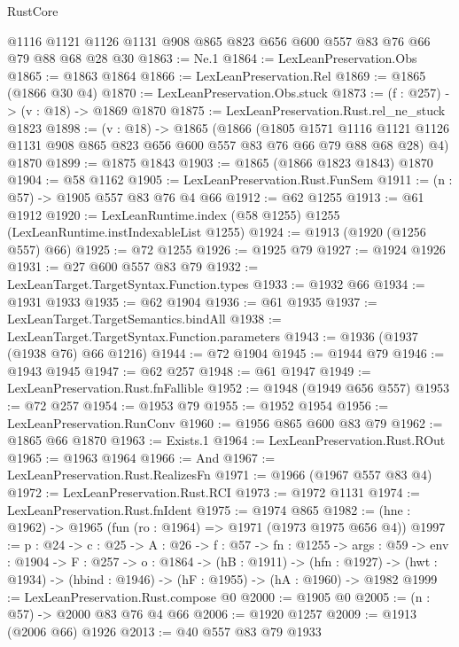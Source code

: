 \begin{lexlean}{RustCore}
\begin{coremodule}
    @1116
    @1121
    @1126
    @1131
    @908
    @865
    @823
    @656
    @600
    @557
    @83
    @76
    @66
    @79
    @88
    @68
    @28
    @30
@1863 := Ne.{1}
@1864 := LexLeanPreservation.Obs
@1865 := @1863 @1864
@1866 := LexLeanPreservation.Rel
@1869 := @1865 (@1866 @30 @4)
@1870 := LexLeanPreservation.Obs.stuck
@1873 := (f : @257) -> (v : @18) -> @1869 @1870
@1875 := LexLeanPreservation.Rust.rel_ne_stuck @1823
@1898 := (v : @18) ->
  @1865
    (@1866
      (@1805
        @1571
        @1116
        @1121
        @1126
        @1131
        @908
        @865
        @823
        @656
        @600
        @557
        @83
        @76
        @66
        @79
        @88
        @68
        @28)
      @4)
    @1870
@1899 := @1875 @1843
@1903 := @1865 (@1866 @1823 @1843) @1870
@1904 := @58 @1162
@1905 := LexLeanPreservation.Rust.FunSem
@1911 := (n : @57) -> @1905 @557 @83 @76 @4 @66
@1912 := @62 @1255
@1913 := @61 @1912
@1920 := LexLeanRuntime.index (@58 @1255) @1255 (LexLeanRuntime.instIndexableList @1255)
@1924 := @1913 (@1920 (@1256 @557) @66)
@1925 := @72 @1255
@1926 := @1925 @79
@1927 := @1924 @1926
@1931 := @27 @600 @557 @83 @79
@1932 := LexLeanTarget.TargetSyntax.Function.types
@1933 := @1932 @66
@1934 := @1931 @1933
@1935 := @62 @1904
@1936 := @61 @1935
@1937 := LexLeanTarget.TargetSemantics.bindAll
@1938 := LexLeanTarget.TargetSyntax.Function.parameters
@1943 := @1936 (@1937 (@1938 @76) @66 @1216)
@1944 := @72 @1904
@1945 := @1944 @79
@1946 := @1943 @1945
@1947 := @62 @257
@1948 := @61 @1947
@1949 := LexLeanPreservation.Rust.fnFallible
@1952 := @1948 (@1949 @656 @557)
@1953 := @72 @257
@1954 := @1953 @79
@1955 := @1952 @1954
@1956 := LexLeanPreservation.RunConv
@1960 := @1956 @865 @600 @83 @79
@1962 := @1865 @66 @1870
@1963 := Exists.{1}
@1964 := LexLeanPreservation.Rust.ROut
@1965 := @1963 @1964
@1966 := And
@1967 := LexLeanPreservation.Rust.RealizesFn
@1971 := @1966 (@1967 @557 @83 @4)
@1972 := LexLeanPreservation.Rust.RCI
@1973 := @1972 @1131
@1974 := LexLeanPreservation.Rust.fnIdent
@1975 := @1974 @865
@1982 := (hne : @1962) -> @1965 (fun (ro : @1964) => @1971 (@1973 @1975 @656 @4))
@1997 := {p : @24} ->
  {c : @25} ->
  {A : @26} ->
  {f : @57} ->
  {fn : @1255} ->
  {args : @59} ->
  {env : @1904} ->
  {F : @257} ->
  {o : @1864} ->
  (hB : @1911) ->
  (hfn : @1927) -> (hwt : @1934) -> (hbind : @1946) -> (hF : @1955) -> (hA : @1960) -> @1982
@1999 := LexLeanPreservation.Rust.compose @0
@2000 := @1905 @0
@2005 := (n : @57) -> @2000 @83 @76 @4 @66
@2006 := @1920 @1257
@2009 := @1913 (@2006 @66) @1926
@2013 := @40 @557 @83 @79 @1933

\end{coremodule}
\end{lexlean}
